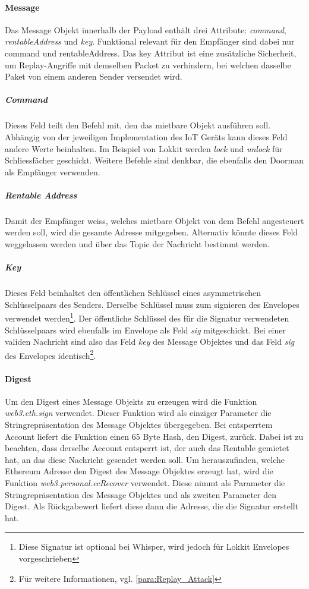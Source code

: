 \paragraph{Message}
\label{sys_para:Message}
Das Message Objekt innerhalb der Payload enthält drei Attribute: \emph{command}, \emph{rentableAddress} und \emph{key}. Funktional relevant für den Empfänger sind dabei nur command und rentableAddress. Das key Attribut ist eine zusätzliche Sicherheit, um Replay-Angriffe mit demselben Packet zu verhindern, bei welchen dasselbe Paket von einem anderen Sender versendet wird.
\subparagraph{Command}
\label{sys_subpara:Command}
Dieses Feld teilt den Befehl mit, den das mietbare Objekt ausführen soll. Abhängig von der jeweiligen Implementation des IoT Geräts kann dieses Feld andere Werte beinhalten. Im Beispiel von Lokkit werden \emph{lock} und \emph{unlock} für Schliessfächer geschickt. Weitere Befehle sind denkbar, die ebenfalls den Doorman als Empfänger verwenden.
\subparagraph{Rentable Address}
Damit der Empfänger weiss, welches mietbare Objekt von dem Befehl angesteuert werden soll, wird die gesamte Adresse mitgegeben. Alternativ könnte dieses Feld weggelassen werden und über das Topic der Nachricht bestimmt werden.

\subparagraph{Key}
\label{sys_para:Key}
Dieses Feld beinhaltet den öffentlichen Schlüssel eines asymmetrischen Schlüsselpaars des Senders. Derselbe Schlüssel muss zum signieren des Envelopes verwendet werden\footnote{Diese Signatur ist optional bei Whisper, wird jedoch für Lokkit Envelopes vorgeschrieben}. Der öffentliche Schlüssel des für die Signatur verwendeten Schlüsselpaars wird ebenfalls im Envelope als Feld \emph{sig} mitgeschickt. Bei einer validen Nachricht sind also das Feld \emph{key} des Message Objektes und das Feld \emph{sig} des Envelopes identisch\footnote{Für weitere Informationen, vgl. \ref{para:Replay_Attack}}.

\paragraph{Digest}
\label{sys_para:Digest}
Um den Digest eines Message Objekts zu erzeugen wird die Funktion \emph{web3.eth.sign} verwendet. Dieser Funktion wird als einziger Parameter die Stringrepräsentation des Message Objektes übergegeben. Bei entsperrtem Account liefert die Funktion einen 65 Byte Hash, den Digest, zurück. Dabei ist zu beachten, dass derselbe Account entsperrt ist, der auch das Rentable gemietet hat, an das diese Nachricht gesendet werden soll. Um herauszufinden, welche Ethereum Adresse den Digest des Message Objektes erzeugt hat, wird die Funktion \emph{web3.personal.ecRecover} verwendet. Diese nimmt als Parameter die Stringrepräsentation des Message Objektes und als zweiten Parameter den Digest. Als Rückgabewert liefert diese dann die Adresse, die die Signatur erstellt hat.

